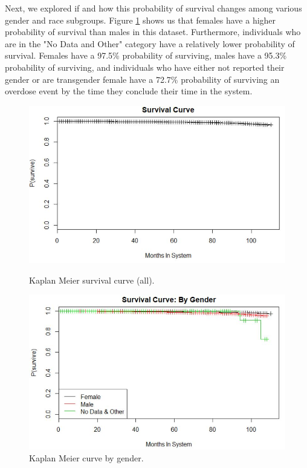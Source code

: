 \documentclass[twoside,10.5pt]{article}
\begin{document}
Next, we explored if and how this probability of survival changes among various gender and race subgroups. Figure \ref{fig:km_gender} shows us that females have a higher probability of survival than males in this dataset. Furthermore, individuals who are in the "No Data and Other" category have a relatively lower probability of survival. Females have a 97.5\% probability of surviving, males have a 95.3\% probability of surviving, and individuals who have either not reported their gender or are transgender female have a 72.7\% probability of surviving an overdose event by the time they conclude their time in the system. 

\begin{figure}[h!]
\centering
\begin{minipage}{.5\textwidth}
  \centering
  \includegraphics[width=1\linewidth]{images/kaplan_meier.JPG}
  \caption{Kaplan Meier survival curve (all).}
  \label{fig:km_original}
\end{minipage}%
\begin{minipage}{.5\textwidth}
  \centering
  \includegraphics[width=1\linewidth]{images/kaplan_meier_gender.JPG}
  \caption{Kaplan Meier curve by gender.}
  \label{fig:km_gender}
\end{minipage}
\end{figure}
\end{document}
